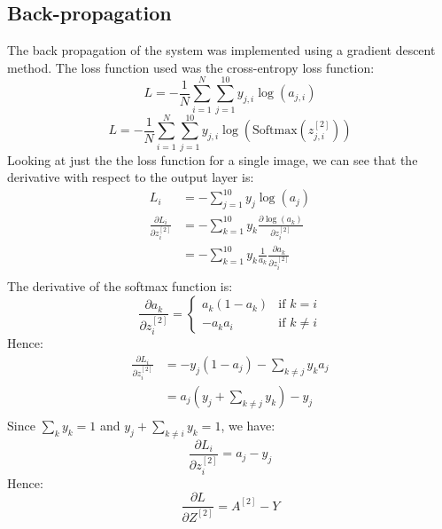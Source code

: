 \documentclass[11pt]{article}
\theoremstyle{definition}
\begin{document}
\subsection{Back-propagation}
The back propagation of the system was implemented using a gradient descent method.
The loss function used was the cross-entropy loss function:
\begin{equation}
    L = -\frac{1}{N}\sum_{i=1}^{N}\sum_{j=1}^{10}y_{j,i}\log(a_{j,i})
\end{equation}
\begin{equation}
    L = -\frac{1}{N}\sum_{i=1}^{N}\sum_{j=1}^{10}y_{j,i}\log(\text{Softmax}(z^{[2]}_{j,i}))
\end{equation}
Looking at just the the loss function for a single image, we can see that the 
derivative with respect to the output layer is:
\begin{align*}
    L_{i} &= -\sum_{j=1}^{10}y_{j}\log(a_{j}) \\
    \frac{\partial L_{i}}{\partial z^{[2]}_{i}} &= - \sum_{k=1}^{10}y_{k}\frac{\partial
        \log(a_{k})}{\partial z^{[2]}_{i}} \\
    &= - \sum_{k=1}^{10}y_{k}\frac{1}{a_{k}}\frac{\partial a_{k}}{\partial z^{[2]}_{i}} \\
\end{align*}
The derivative of the softmax function is:
\begin{equation}
    \frac{\partial a_{k}}{\partial z^{[2]}_{i}} = \begin{cases}
        a_{k}(1-a_{k}) & \text{if } k = i \\
        -a_{k}a_{i} & \text{if } k \neq i
    \end{cases}
\end{equation}
Hence:
\begin{align*}
    \frac{\partial L_{i}}{\partial z^{[2]}_{i}} &= -y_{j}(1-a_{j}) - \sum_{k \neq j}y_{k}a_{j}\\
                                                &= a_{j} \left( y_{j} + \sum_{k \neq j}y_{k} \right) - y_{j} \\
\end{align*}
Since $\sum_{k}y_{k} = 1$ and $y_{j} + \sum_{k \neq i}y_{k} = 1$, we have:
\begin{equation}
    \frac{\partial L_{i}}{\partial z^{[2]}_{i}} = a_{j} - y_{j}
\end{equation}
Hence:
\begin{equation}
    \frac{\partial L}{\partial Z^{[2]}} = A^{[2]} - Y
\end{equation}
\end{document}
